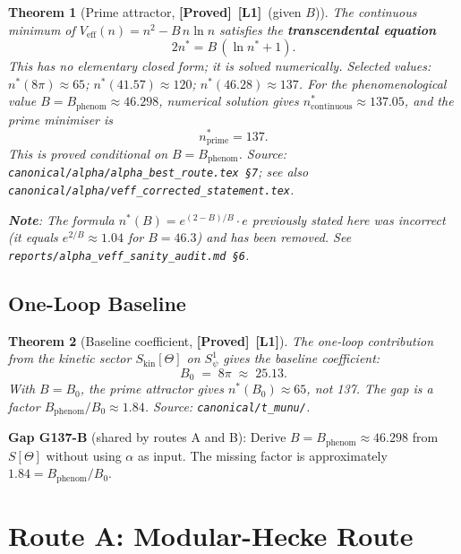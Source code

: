 \documentclass[12pt,a4paper]{article}
\newtheorem{theorem}{Theorem}[section]
\theoremstyle{definition}
\theoremstyle{remark}
\newcommand{\PROVED}{\textbf{[Proved]}}
\newcommand{\Lone}{\textbf{[L1]}}
\begin{document}
\begin{theorem}[Prime attractor, \PROVED\ \Lone\ (given $B$)]
\label{thm:prime_attractor}
The continuous minimum of $V_{\mathrm{eff}}(n) = n^2 - B\,n\ln n$ satisfies the
\textbf{transcendental equation}
\begin{equation}
  2n^* = B\,(\ln n^* + 1).
  \label{eq:nstar_transcendental}
\end{equation}
This has no elementary closed form; it is solved numerically.
Selected values: $n^*(8\pi)\approx 65$; $n^*(41.57)\approx 120$; $n^*(46.28)\approx 137$.
For the phenomenological value $B = B_{\mathrm{phenom}} \approx 46.298$,
numerical solution gives $n^*_{\mathrm{continuous}} \approx 137.05$, and the
prime minimiser is
\[
  n^*_{\mathrm{prime}} = 137.
\]
This is proved conditional on $B = B_{\mathrm{phenom}}$.
Source: \texttt{canonical/alpha/alpha\_best\_route.tex~\S7};
see also \texttt{canonical/alpha/veff\_corrected\_statement.tex}.

\textbf{Note}: The formula $n^*(B) = e^{(2-B)/B}\cdot e$ previously stated here
was incorrect (it equals $e^{2/B}\approx 1.04$ for $B=46.3$) and has been
removed. See \texttt{reports/alpha\_veff\_sanity\_audit.md~\S6}.
\end{theorem}

\subsection{One-Loop Baseline}

\begin{theorem}[Baseline coefficient, \PROVED\ \Lone]
\label{thm:b0}
The one-loop contribution from the kinetic sector $S_{\mathrm{kin}}[\Theta]$
on $S^1_\psi$ gives the baseline coefficient:
\[
  B_0 \;=\; 8\pi \;\approx\; 25.13.
\]
With $B = B_0$, the prime attractor gives $n^*(B_0) \approx 65$, not 137.
The gap is a factor $B_{\mathrm{phenom}}/B_0 \approx 1.84$.
Source: \texttt{canonical/t\_munu/}.
\end{theorem}

\medskip
\textbf{Gap G137-B} (shared by routes A and B):
Derive $B = B_{\mathrm{phenom}} \approx 46.298$ from $S[\Theta]$
without using $\alpha$ as input.
The missing factor is approximately $1.84 = B_{\mathrm{phenom}} / B_0$.

\section{Route A: Modular-Hecke Route}
\label{sec:route_a}
\end{document}
